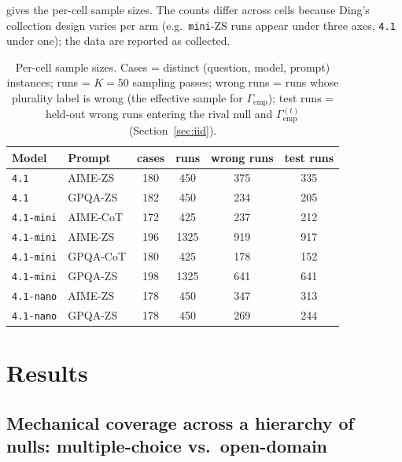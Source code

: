 \documentclass[a4paper,fleqn]{cas-sc}
\newcommand{\agreementIndex}{\Gamma}
\begin{document}
 gives the per-cell sample sizes. The counts differ
across cells because Ding's collection design varies per arm (e.g.\
\texttt{mini}-ZS runs appear under three axes, \texttt{4.1} under one);
the data are reported as collected.

\begin{table}[t]\begin{minipage}{\linewidth}
\centering
\caption{Per-cell sample sizes. Cases = distinct (question, model, prompt) instances; runs = $K=50$ sampling passes; wrong runs = runs whose plurality label is wrong (the effective sample for $\agreementIndex_{\mathrm{emp}}$); test runs = held-out wrong runs entering the rival null and $\agreementIndex_{\mathrm{emp}}^{(t)}$ (Section~\ref{sec:iid}).}
\label{tab:samples}
\begin{tabular}{llcccc}
\toprule
Model & Prompt & cases & runs & wrong runs & test runs \\
\midrule
\texttt{4.1} & AIME-ZS & 180 & 450 & 375 & 335 \\
\texttt{4.1} & GPQA-ZS & 182 & 450 & 234 & 205 \\
\texttt{4.1-mini} & AIME-CoT & 172 & 425 & 237 & 212 \\
\texttt{4.1-mini} & AIME-ZS & 196 & 1325 & 919 & 917 \\
\texttt{4.1-mini} & GPQA-CoT & 180 & 425 & 178 & 152 \\
\texttt{4.1-mini} & GPQA-ZS & 198 & 1325 & 641 & 641 \\
\texttt{4.1-nano} & AIME-ZS & 178 & 450 & 347 & 313 \\
\texttt{4.1-nano} & GPQA-ZS & 178 & 450 & 269 & 244 \\
\bottomrule
\end{tabular}
\end{minipage}\end{table}

\section{Results}
\label{sec:results}

\subsection{Mechanical coverage across a hierarchy of nulls: multiple-choice vs.\ open-domain}
\label{sec:res-kappa}
\end{document}
